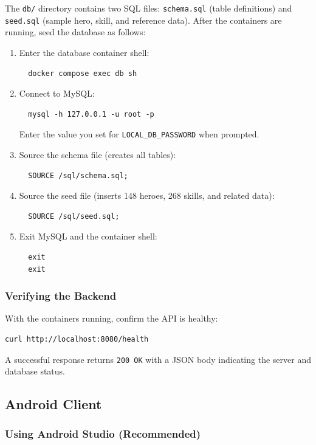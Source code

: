 The \texttt{db/} directory contains two SQL files: \texttt{schema.sql} (table definitions) and \texttt{seed.sql} (sample hero, skill, and reference data). After the containers are running, seed the database as follows:

\begin{enumerate}
  \item Enter the database container shell:
  \begin{verbatim}
  docker compose exec db sh
  \end{verbatim}
  \item Connect to MySQL:
  \begin{verbatim}
  mysql -h 127.0.0.1 -u root -p
  \end{verbatim}
  Enter the value you set for \texttt{LOCAL\_DB\_PASSWORD} when prompted.
  \item Source the schema file (creates all tables):
  \begin{verbatim}
  SOURCE /sql/schema.sql;
  \end{verbatim}
  \item Source the seed file (inserts 148 heroes, 268 skills, and related data):
  \begin{verbatim}
  SOURCE /sql/seed.sql;
  \end{verbatim}
  \item Exit MySQL and the container shell:
  \begin{verbatim}
  exit
  exit
  \end{verbatim}
\end{enumerate}

\subsubsection{Verifying the Backend}

With the containers running, confirm the API is healthy:

\begin{verbatim}
curl http://localhost:8080/health
\end{verbatim}

A successful response returns \texttt{200 OK} with a JSON body indicating the server and database status.

\subsection{Android Client}

\subsubsection{Using Android Studio (Recommended)}

